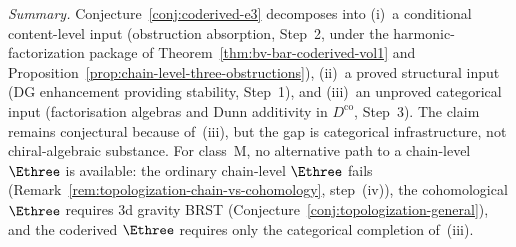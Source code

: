 \begin{remark}
\emph{Summary.}
Conjecture~\ref{conj:coderived-e3} decomposes into
(i)~a conditional content-level input (obstruction absorption,
Step~2, under the harmonic-factorization package of
Theorem~\ref{thm:bv-bar-coderived-vol1} and
Proposition~\ref{prop:chain-level-three-obstructions}),
(ii)~a proved structural input (DG enhancement providing
stability, Step~1), and
(iii)~an unproved categorical input (factorisation algebras and
Dunn additivity in $D^{\mathrm{co}}$, Step~3).
The claim remains conjectural because of~(iii), but the gap is
categorical infrastructure, not
chiral-algebraic substance. For class~M, no alternative path to
a chain-level $\Ethree$ is available: the ordinary chain-level
$\Ethree$ fails
(Remark~\ref{rem:topologization-chain-vs-cohomology},
step~(iv)), the cohomological $\Ethree$ requires $3$d gravity
BRST (Conjecture~\ref{conj:topologization-general}), and the
coderived $\Ethree$ requires only the categorical completion
of~(iii).
\end{remark}


